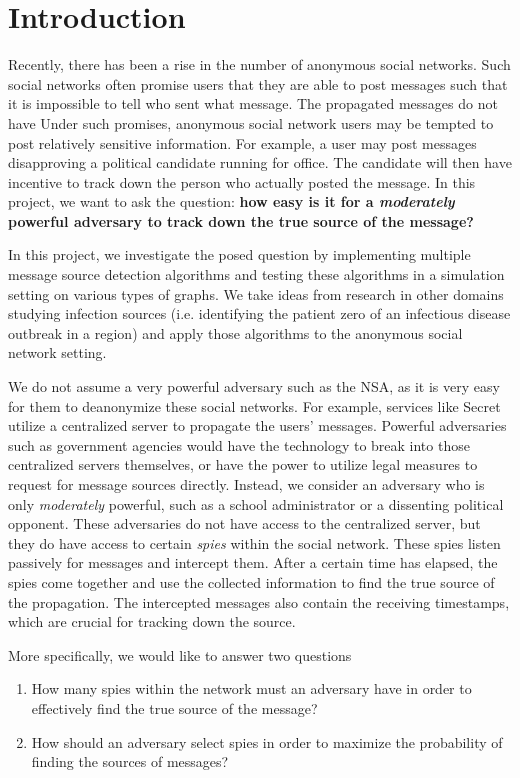 \section{Introduction}

Recently, there has been a rise in the number of anonymous social networks. Such social networks  often promise users that they are able to post messages such that it is impossible to tell who sent what message. The propagated messages do not have 
Under such promises, anonymous social network users may be tempted to post relatively sensitive information. For example, a user may post messages disapproving a political candidate running for office. The candidate will then have incentive to track down the person who actually posted the message. In this project, we want to ask the question: \textbf{how easy is it for a \emph{moderately} powerful adversary to track down the true source of the message?}

In this project, we investigate the posed question by implementing multiple message source detection algorithms and testing these algorithms in a simulation setting on various types of graphs. We take ideas from research in other domains studying infection sources (i.e. identifying the patient zero of an infectious disease outbreak in a region) and apply those algorithms to the anonymous social network setting. 

We do not assume a very powerful adversary such as the NSA, as it is very easy for them to deanonymize these social networks. For example, services like Secret utilize a centralized server to propagate the users' messages. Powerful adversaries such as government agencies would have the technology to break into those centralized servers themselves, or have the power to utilize legal measures to request for message sources directly. Instead, we consider an adversary who is only \emph{moderately} powerful, such as a school administrator or a dissenting political opponent. These adversaries do not have access to the centralized server, but they do have access to certain \emph{spies} within the social network. These spies listen passively for messages and intercept them. After a certain time has elapsed, the spies come together and use the collected information to find the true source of the propagation. The intercepted messages also contain the receiving timestamps, which are crucial for tracking down the source.

More specifically, we would like to answer two questions
\begin{enumerate}
\item How many spies within the network must an adversary have in order to effectively find the true source of the message?
\item How should an adversary select spies in order to maximize the probability of finding the sources of messages? 
\end{enumerate}


